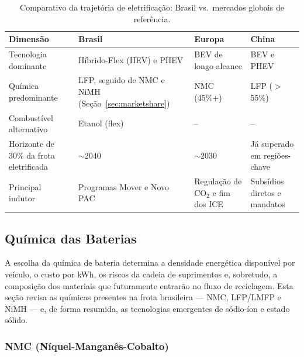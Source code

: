 \begin{table}[H]
    \centering
    \caption{Comparativo da trajetória de eletrificação: Brasil vs.\ mercados
             globais de referência.}
    \label{tab:comparativo-mercados}
    \renewcommand{\arraystretch}{1.4}
    \small
    \begin{tabularx}{\textwidth}{
        >{\raggedright\arraybackslash}p{3.6cm}
        >{\raggedright\arraybackslash}X
        >{\raggedright\arraybackslash}X
        >{\raggedright\arraybackslash}X }
    \toprule
    \textbf{Dimensão} & \textbf{Brasil} & \textbf{Europa} & \textbf{China} \\
    \midrule
    Tecnologia dominante & Híbrido-Flex (HEV) e PHEV & BEV de longo alcance & BEV e PHEV \\
    Química predominante & LFP, seguido de NMC e NiMH (Seção~\ref{sec:marketshare}) & NMC (45\%+) & LFP ($>$55\%) \\
    Combustível alternativo & Etanol (flex) & -- & -- \\
    Horizonte de 30\% da frota eletrificada & $\sim$2040 & $\sim$2030 & Já superado em regiões-chave \\
    Principal indutor & Programas Mover e Novo PAC & Regulação de CO$_2$ e fim dos ICE & Subsídios diretos e mandatos \\
    \bottomrule
    \end{tabularx}
\end{table}

\subsection{Química das Baterias}
\label{sec:quimicas}

A escolha da química de bateria determina a densidade energética disponível por
veículo, o custo por kWh, os riscos da cadeia de suprimentos e, sobretudo, a
composição dos materiais que futuramente entrarão no fluxo de reciclagem. Esta
seção revisa as químicas presentes na frota brasileira — NMC, LFP/LMFP e NiMH —
e, de forma resumida, as tecnologias emergentes de sódio-íon e estado sólido.

\subsubsection{NMC (Níquel-Manganês-Cobalto)}
\label{subsec:nmc}

